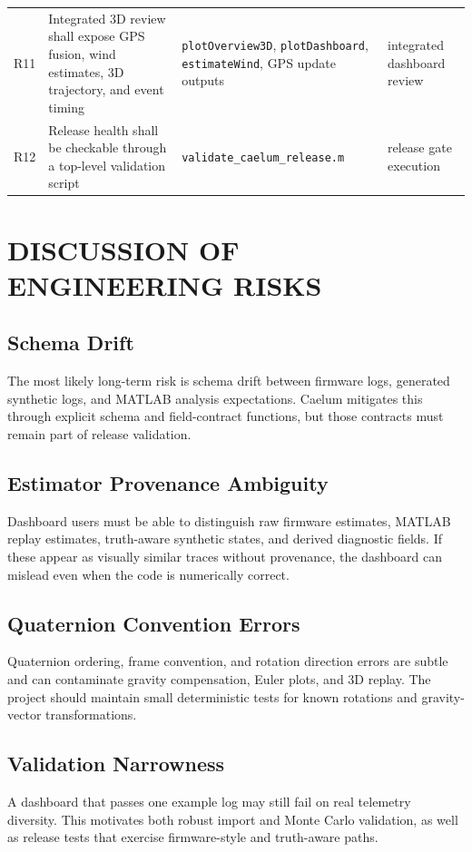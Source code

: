 \documentclass[colorlinks,upint,subscriptcorrection,varvw,hyphenate,balance]{asmeconf}
\newcommand{\code}[1]{\texttt{\allowbreak#1}}
\begin{document}
\begin{table}[t]
\begin{tabularx}{\textwidth}{l Y Y Y}
R11 & Integrated 3D review shall expose GPS fusion, wind estimates, 3D trajectory, and event timing & \code{plotOverview3D}, \code{plotDashboard}, \code{estimateWind}, GPS update outputs & integrated dashboard review \\
R12 & Release health shall be checkable through a top-level validation script & \code{validate\_caelum\_release.m} & release gate execution \\
\bottomrule
\end{tabularx}
\label{tab:traceability}
\end{table}

\section{DISCUSSION OF ENGINEERING RISKS}

\subsection{Schema Drift}
The most likely long-term risk is schema drift between firmware logs, generated synthetic logs, and MATLAB analysis expectations. Caelum mitigates this through explicit schema and field-contract functions, but those contracts must remain part of release validation.

\subsection{Estimator Provenance Ambiguity}
Dashboard users must be able to distinguish raw firmware estimates, MATLAB replay estimates, truth-aware synthetic states, and derived diagnostic fields. If these appear as visually similar traces without provenance, the dashboard can mislead even when the code is numerically correct.

\subsection{Quaternion Convention Errors}
Quaternion ordering, frame convention, and rotation direction errors are subtle and can contaminate gravity compensation, Euler plots, and 3D replay. The project should maintain small deterministic tests for known rotations and gravity-vector transformations.

\subsection{Validation Narrowness}
A dashboard that passes one example log may still fail on real telemetry diversity. This motivates both robust import and Monte Carlo validation, as well as release tests that exercise firmware-style and truth-aware paths.
\end{document}
